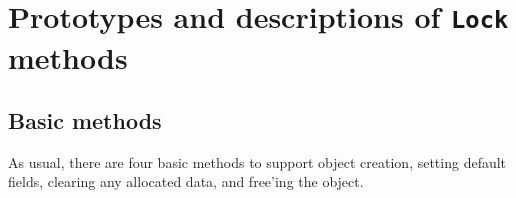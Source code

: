 \par
\section{Prototypes and descriptions of {\tt Lock} methods}
\label{section:Lock:proto}
\par
\subsection{Basic methods}
\label{subsection:Lock:proto:basics}
\par
As usual, there are four basic methods to support object creation,
setting default fields, clearing any allocated data, and free'ing
the object.
\par
